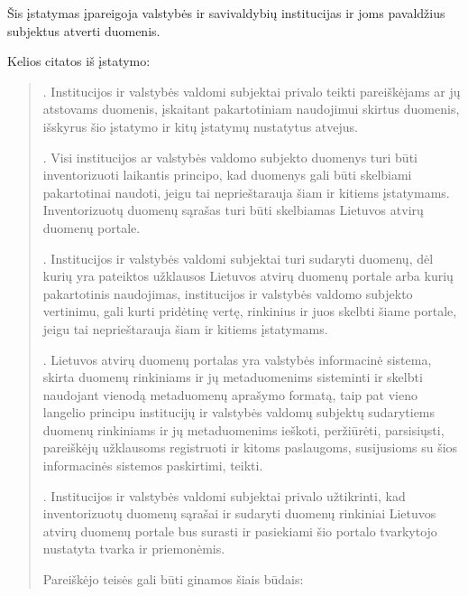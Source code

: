 \documentclass[letterpaper,10pt,lithuanian]{sphinxmanual}
\begin{document}
\begin{description}
\sphinxAtStartPar
Šis įstatymas įpareigoja valstybės ir savivaldybių institucijas ir
joms pavaldžius subjektus atverti duomenis.

\sphinxAtStartPar
Kelios citatos iš įstatymo:
\begin{quote}

\sphinxAtStartPar
{}

. Institucijos ir valstybės valdomi subjektai privalo teikti
pareiškėjams ar jų atstovams duomenis, įskaitant pakartotiniam
naudojimui skirtus duomenis, išskyrus šio įstatymo ir kitų įstatymų
nustatytus atvejus.

\sphinxAtStartPar
{}

. Visi institucijos ar valstybės valdomo subjekto duomenys turi
būti inventorizuoti laikantis principo, kad duomenys gali būti
skelbiami pakartotinai naudoti, jeigu tai neprieštarauja šiam ir
kitiems įstatymams. Inventorizuotų duomenų sąrašas turi būti
skelbiamas Lietuvos atvirų duomenų portale.

. Institucijos ir valstybės valdomi subjektai turi sudaryti
duomenų, dėl kurių yra pateiktos užklausos Lietuvos atvirų duomenų
portale arba kurių pakartotinis naudojimas, institucijos ir
valstybės valdomo subjekto vertinimu, gali kurti pridėtinę vertę,
rinkinius ir juos skelbti šiame portale, jeigu tai neprieštarauja
šiam ir kitiems įstatymams.

\sphinxAtStartPar
{}

. Lietuvos atvirų duomenų portalas yra valstybės informacinė
sistema, skirta duomenų rinkiniams ir jų metaduomenims sisteminti ir
skelbti naudojant vienodą metaduomenų aprašymo formatą, taip pat
vieno langelio principu institucijų ir valstybės valdomų subjektų
sudarytiems duomenų rinkiniams ir jų metaduomenims ieškoti,
peržiūrėti, parsisiųsti, pareiškėjų užklausoms registruoti ir kitoms
paslaugoms, susijusioms su šios informacinės sistemos paskirtimi,
teikti.

. Institucijos ir valstybės valdomi subjektai privalo užtikrinti,
kad inventorizuotų duomenų sąrašai ir sudaryti duomenų rinkiniai
Lietuvos atvirų duomenų portale bus surasti ir pasiekiami šio
portalo tvarkytojo nustatyta tvarka ir priemonėmis.

\sphinxAtStartPar
{}

\sphinxAtStartPar
Pareiškėjo teisės gali būti ginamos šiais būdais:


\end{quote}
\end{description}
\end{document}
